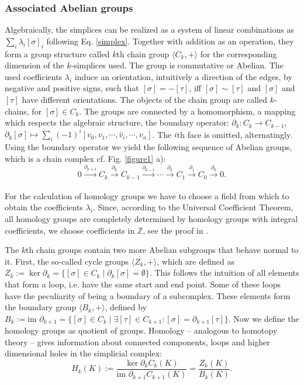 \documentclass[runningheads,orivec]{llncs}
\begin{document}
\subsubsection{Associated Abelian groups} Algebraically, the simplices can be realized as a system of linear combinations as $\sum_i \lambda_i [\sigma]_{i}$ following Eq. \ref{simplex}. Together with addition as an operation, they form a group structure called $k$th chain group $\langle C_k, +\rangle$ for the corresponding dimension of the $k$-simplices used. The group is commutative or Abelian. The used coefficients $\lambda_i$ induce an orientation, intuitively a direction of the edges, by negative and positive signs, such that $[\sigma] = -[\tau]$, iff $[\sigma] \sim [\tau]$ and $[\sigma]$ and $[\tau]$ have different orientations. The objects of the chain group are called $k$-chains, for $[\sigma] \in C_k$. The groups are connected by a homomorphism, a mapping which respects the algebraic structure, the boundary operator: $\partial_k: C_k \rightarrow C_{k-1}$, $\partial_k [\sigma] \mapsto \sum_i (-1)^i [v_0,v_1,\cdots,\hat{v}_i, \cdots, v_n]$. The $i$th face is omitted, alternatingly. Using the boundary operator we yield the following sequence of Abelian groups, which is a chain complex cf. Fig. \ref{figure1} a):
\begin{equation}
    0 \xrightarrow[]{\partial_{k+1}} C_k \xrightarrow[]{\partial_{k}} C_{k-1} \xrightarrow[]{\partial_{k-1}} \cdots \xrightarrow[]{\partial_{2}} C_1 \xrightarrow[]{\partial_{1}} C_0 \xrightarrow[]{\partial_{0}} 0.
\end{equation}

For the calculation of homology groups we have to choose a field from which to obtain the coefficients $\lambda_i$. Since, according to the Universal Coefficient Theorem, all homology groups are completely determined by homology groups with integral coefficients, we choose coefficients in $\mathbb{Z}$, see the proof in \cite{gruenberg1968universal}.

The $k$th chain groups contain two more Abelian subgroups that behave normal to it. First, the so-called cycle groups $\langle Z_k, +\rangle$, which are defined as $Z_k := \ker \partial_k = \{[\sigma] \in C_k \; \vert \; \partial_k [\sigma] = \emptyset \}$. This follows the intuition of all elements that form a loop, i.e. have the same start and end point. Some of these loops have the peculiarity of being a boundary of a subcomplex. These elements form the boundary group $\langle B_k, +\rangle$, defined by $B_k := \text{im } \partial_{k+1} = \{[\sigma] \in C_k \; \vert \; \exists [\tau] \in C_{k+1}: [\sigma] = \partial_{k+1}[\tau]\}$. Now we define the homology groups as quotient of groups. Homology -- analogous to homotopy theory -- gives information about connected components, loops and higher dimensional holes in the simplicial complex:
\begin{equation}
    H_k(K) := \frac{\ker \partial_k C_k(K)}{\text{im } \partial_{k+1} C_{k+1}(K)} = \frac{Z_k(K)}{B_k(K)}.
\end{equation}
\end{document}
